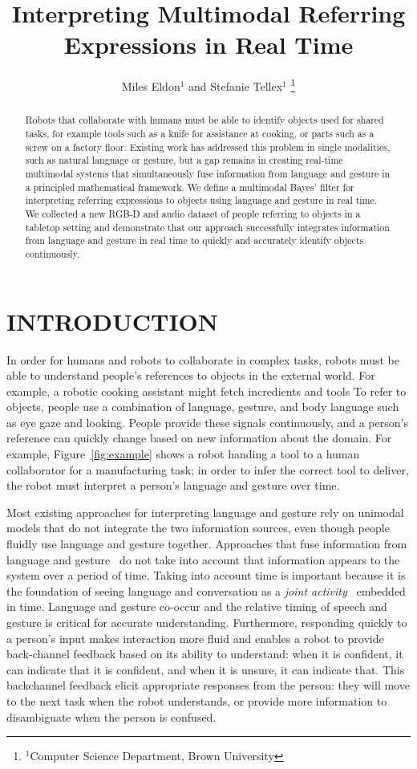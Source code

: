 \documentclass[letterpaper, 10 pt, conference]{ieeeconf}
\title{\LARGE \bf
Interpreting Multimodal Referring Expressions in Real Time}
\author{Miles Eldon$^{1}$ and Stefanie Tellex$^{1}$
\thanks{$^{1}$Computer Science Department, Brown University}
}
\begin{document}
\maketitle
\thispagestyle{empty}
\pagestyle{empty}

\begin{abstract}
Robots that collaborate with humans must be able to identify objects
used for shared tasks, for example tools such as a knife for
assistance at cooking, or parts such as a screw on a factory floor.
Existing work has addressed this problem in single modalities, such as
natural language or gesture, but a gap remains in creating real-time
multimodal systems that simultaneously fuse information from language
and gesture in a principled mathematical framework.  We define a
multimodal Bayes' filter for interpreting referring expressions to
objects using language and gesture in real time.  We collected a new
RGB-D and audio dataset of people referring to objects in a tabletop
setting and demonstrate that our approach successfully integrates
information from language and gesture in real time to quickly and
accurately identify objects continuously.
\end{abstract}

\section{INTRODUCTION}

In order for humans and robots to collaborate in complex tasks, robots
must be able to understand people's references to objects in the
external world.  For example, a robotic cooking assistant might fetch incredients and tools To refer to objects, people use a combination of
language, gesture, and body language such as eye gaze and looking.
People provide these signals continuously, and a person's reference
can quickly change based on new information about the domain.  For
example, Figure~\ref{fig:example} shows a robot handing a tool to a
human collaborator for a manufacturing task; in order to infer the
correct tool to deliver, the robot must interpret a person's language
and gesture over time.

Most existing approaches for interpreting language and gesture rely on
unimodal models that do not integrate the two information sources,
even though people fluidly use language and gesture together.
Approaches that fuse information from language and
gesture~\citep{matuszek14} do not take into account that information
appears to the system over a period of time.  Taking into account time
is important because it is the foundation of seeing language and
conversation as a {\em joint activity}~\citep{clark96} embedded in
time.  Language and gesture co-occur and the relative timing of speech
and gesture is critical for accurate understanding.  Furthermore,
responding quickly to a person's input makes interaction more fluid
and enables a robot to provide back-channel feedback based on its
ability to understand: when it is confident, it can indicate that it
is confident, and when it is unsure, it can indicate that.  This
backchannel feedback elicit appropriate responses from the person:
they will move to the next task when the robot understands, or provide
more information to disambiguate when the person is confused.
\end{document}
